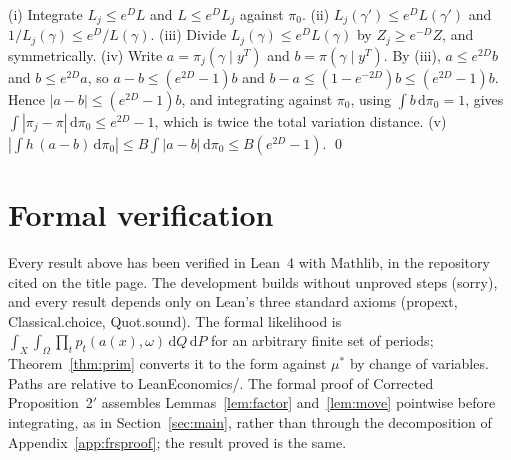 \documentclass[11pt]{article}
\theoremstyle{definition}
\theoremstyle{remark}
\newcommand{\leanunderscore}{\char`\_\hskip 0pt plus 0.4pt\relax}
\newcommand{\lean}[1]{\begingroup\ttfamily\small\let\_\leanunderscore #1\endgroup}
\newcommand{\dd}{\mathrm{d}}
\begin{document}
(i) Integrate $L_j \le e^{D}L$ and $L \le e^{D}L_j$ against $\pi_0$.
(ii) $L_j(\gamma') \le e^{D}L(\gamma')$ and $1/L_j(\gamma) \le e^{D}/L(\gamma)$.
(iii) Divide $L_j(\gamma) \le e^{D}L(\gamma)$ by $Z_j \ge e^{-D}Z$, and symmetrically.
(iv) Write $a = \pi_j(\gamma\mid y^T)$ and $b = \pi(\gamma\mid y^T)$. By (iii), $a \le e^{2D}b$
and $b \le e^{2D}a$, so $a - b \le (e^{2D}-1)b$ and $b - a \le (1 - e^{-2D})b \le (e^{2D}-1)b$.
Hence $|a - b| \le (e^{2D}-1)b$, and integrating against $\pi_0$, using $\int b\,\dd\pi_0 = 1$,
gives $\int|\pi_j - \pi|\,\dd\pi_0 \le e^{2D}-1$, which is twice the total variation distance.
(v) $|\int h\,(a - b)\,\dd\pi_0| \le B\int|a - b|\,\dd\pi_0 \le B(e^{2D}-1)$. \qed

\section{Formal verification}\label{app:lean}

Every result above has been verified in Lean~4 with Mathlib, in the repository cited on the title
page. The development builds without unproved steps (\lean{sorry}), and every result depends only
on Lean's three standard axioms (\lean{propext}, \lean{Classical.choice}, \lean{Quot.sound}). The
formal likelihood is $\int_X\int_\Omega\prod_t p_t(a(x),\omega)\,\dd Q\,\dd P$ for an arbitrary
finite set of periods; Theorem~\ref{thm:prim} converts it to the form against $\mu^*$ by change of
variables. Paths are relative to \lean{LeanEconomics/}. The formal proof of Corrected
Proposition~2$'$ assembles Lemmas~\ref{lem:factor} and~\ref{lem:move} pointwise before integrating,
as in Section~\ref{sec:main}, rather than through the decomposition of
Appendix~\ref{app:frsproof}; the result proved is the same.
\end{document}
